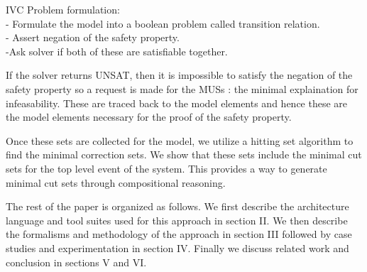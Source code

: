 IVC Problem formulation: \\
- Formulate the model into a boolean problem called transition relation. \\
- Assert negation of the safety property.\\
 -Ask solver if both of these are satisfiable together.

If the solver returns UNSAT, then it is impossible to satisfy the negation of the safety property so a request is made for the MUSs : the minimal explaination for infeasability. These are traced back to the model elements and hence these are the model elements necessary for the proof of the safety property. 

 Once these sets are collected for the model, we utilize a hitting set algorithm to find the minimal correction sets. We show that these sets include the minimal cut sets for the top level event of the system. This provides a way to generate minimal cut sets through compositional reasoning.

The rest of the paper is organized as follows. We first describe the architecture language and tool suites used for this approach in section II. We then describe the formalisms and methodology of the approach in section III followed by case studies and experimentation in section IV. Finally we discuss related work and conclusion in sections V and VI.  
